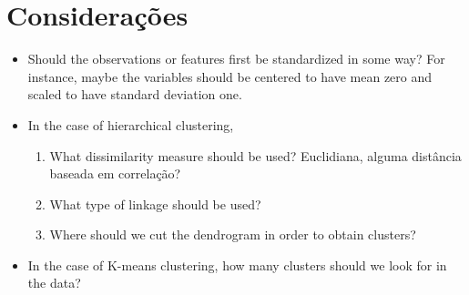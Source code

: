
\section{Considerações}
\begin{itemize}
\item Should the observations or features first be standardized in some way? For instance, maybe the variables should be centered to have mean zero and scaled to have standard deviation one.

\item In the case of hierarchical clustering,

\begin{enumerate}
    \item What dissimilarity measure should be used? Euclidiana, alguma distância baseada em correlação?
    
    \item What type of linkage should be used?
    
    \item Where should we cut the dendrogram in order to obtain clusters?
\end{enumerate}

\item In the case of K-means clustering, how many clusters should we look for in the data?
\end{itemize}